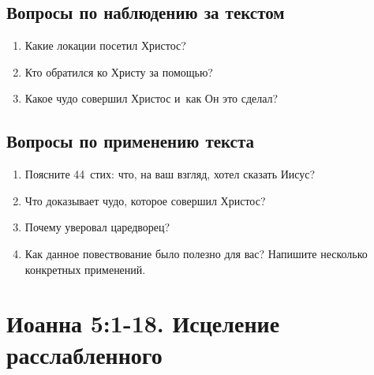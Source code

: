 \documentclass[a4paper,12pt]{article}
\begin{document}
\subsection*{Вопросы по наблюдению за текстом}
\begin{enumerate}
    \item Какие локации посетил Христос? 
    
    \myline
    
    \myline
    \item Кто обратился ко Христу за помощью? 
    
    \myline
    
    \myline
    \item Какое чудо совершил Христос и~как Он это сделал? 
    
    \myline
    
    \myline
\end{enumerate}

\subsection*{Вопросы по применению текста} 
\begin{enumerate}
    \item Поясните 44~стих: что, на ваш взгляд, хотел сказать Иисус? 
    
    \myline
    
    \myline
    \item Что доказывает чудо, которое совершил Христос? 
    
    \myline
    
    \myline
    \item Почему уверовал царедворец? 
    
    \myline
    
    \myline
    \item Как данное повествование было полезно для вас? Напишите несколько конкретных применений.
    
    \myline
    
    \myline
\end{enumerate}



\section{Иоанна 5:1-18. Исцеление расслабленного}
\end{document}
